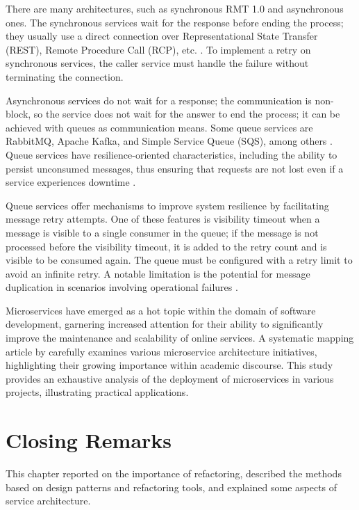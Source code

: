 There are many architectures, such as synchronous RMT 1.0 and asynchronous ones. The synchronous services wait for the response before ending the process; they usually use a direct connection over Representational State Transfer (REST), Remote Procedure Call (RCP), etc. \cite{microservices-comuni}. To implement a retry on synchronous services, the caller service must handle the failure without terminating the connection.

Asynchronous services do not wait for a response; the communication is non-block, so the service does not wait for the answer to end the process; it can be achieved with queues as communication means. Some queue services are RabbitMQ, Apache Kafka, and Simple Service Queue (SQS), among others \cite{KARABEYAKSAKALLI2021111014}. Queue services have resilience-oriented characteristics, including the ability to persist unconsumed messages, thus ensuring that requests are not lost even if a service experiences downtime \cite{Cebeci2020DesignOA}.

Queue services offer mechanisms to improve system resilience by facilitating message retry attempts. One of these features is visibility timeout when a message is visible to a single consumer in the queue; if the message is not processed before the visibility timeout, it is added to the retry count and is visible to be consumed again. The queue must be configured with a retry limit to avoid an infinite retry. A notable limitation is the potential for message duplication in scenarios involving operational failures \cite{ChenScalable}.

Microservices have emerged as a hot topic within the domain of software development, garnering increased attention for their ability to significantly improve the maintenance and scalability of online services. A systematic mapping article by \textcite{Alshuqayran} carefully examines various microservice architecture initiatives, highlighting their growing importance within academic discourse. This study provides an exhaustive analysis of the deployment of microservices in various projects, illustrating practical applications.

\section{Closing Remarks}
\label{sec2-remarks}
This chapter reported on the importance of refactoring, described the methods based on design patterns and refactoring tools, and explained some aspects of service architecture.

